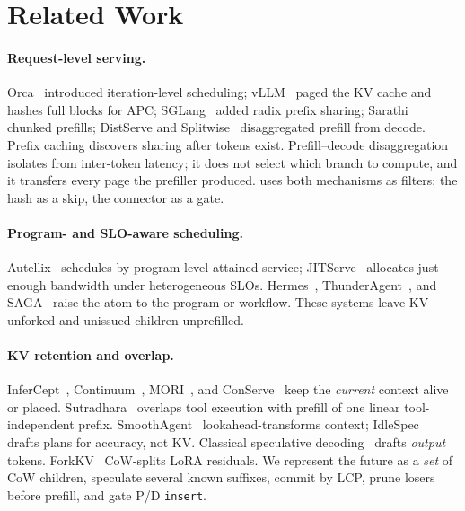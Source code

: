 \section{Related Work}
\label{sec:related}

\paragraph{Request-level serving.}
Orca~\cite{orca} introduced iteration-level scheduling; vLLM~\cite{vllm} paged the KV cache and hashes full blocks for APC; SGLang~\cite{sglang} added radix prefix sharing; Sarathi~\cite{sarathi,sarathisplit} chunked prefills; DistServe and Splitwise~\cite{distserve,splitwise} disaggregated prefill from decode.
Prefix caching discovers sharing after tokens exist.
Prefill--decode disaggregation isolates \ttft{} from inter-token latency; it does not select which branch to compute, and it transfers every page the prefiller produced.
\app uses both mechanisms as filters: the hash as a skip, the connector as a gate.

\paragraph{Program- and SLO-aware scheduling.}
Autellix~\cite{autellix} schedules by program-level attained service; JITServe~\cite{jitserve} allocates just-enough bandwidth under heterogeneous SLOs.
Hermes~\cite{hermes}, ThunderAgent~\cite{thunderagent}, and SAGA~\cite{saga} raise the atom to the program or workflow.
These systems leave KV unforked and unissued children unprefilled.

\paragraph{KV retention and overlap.}
InferCept~\cite{infercept}, Continuum~\cite{continuum}, MORI~\cite{mori}, and ConServe~\cite{conserve} keep the \emph{current} context alive or placed.
Sutradhara~\cite{sutradhara} overlaps tool execution with prefill of one linear tool-independent prefix.
SmoothAgent~\cite{smoothagent} lookahead-transforms context; IdleSpec~\cite{idlespec} drafts plans for accuracy, not KV.
Classical speculative decoding~\cite{speculative,medusa,eagledraft} drafts \emph{output} tokens.
ForkKV~\cite{forkkv} CoW-splits LoRA residuals.
We represent the future as a \emph{set} of CoW children, speculate several known suffixes, commit by LCP, prune losers before prefill, and gate P/D \texttt{insert}.

